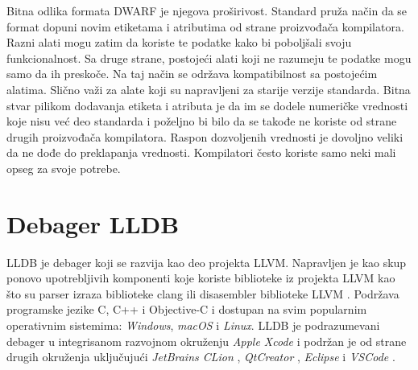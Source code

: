\documentclass[12pt,oneside]{memoir}
\begin{document}
Bitna odlika formata DWARF je njegova proširivost.
Standard pruža način da se format dopuni novim etiketama i atributima od strane proizvođača kompilatora.
Razni alati mogu zatim da koriste te podatke kako bi poboljšali svoju funkcionalnost.
Sa druge strane, postojeći alati koji ne razumeju te podatke mogu samo da ih preskoče.
Na taj način se održava kompatibilnost sa postojećim alatima.
Slično važi za alate koji su napravljeni za starije verzije standarda.
Bitna stvar pilikom dodavanja etiketa i atributa je da im se dodele numeričke vrednosti koje nisu već deo standarda i poželjno bi bilo da se takođe ne koriste od strane drugih proizvođača kompilatora.
Raspon dozvoljenih vrednosti je dovoljno veliki da ne dođe do preklapanja vrednosti.
Kompilatori često koriste samo neki mali opseg za svoje potrebe.

\section{Debager LLDB}
\label{sec:lldb}



LLDB je debager koji se razvija kao deo projekta LLVM.
Napravljen je kao skup ponovo upotrebljivih komponenti koje koriste biblioteke iz projekta LLVM kao što su parser izraza biblioteke clang ili disasembler biblioteke LLVM \cite{lldb}.
Podržava programske jezike C, C++ i Objective-C i dostupan na svim popularnim operativnim sistemima: \textit{Windows}, \textit{macOS} i \textit{Linux}.
LLDB je podrazumevani debager u integrisanom razvojnom okruženju \textit{Apple Xcode} \cite{lldb} i podržan je od strane drugih okruženja uključujući \textit{JetBrains CLion} \cite{clion}, \textit{QtCreator} \cite{qtcreator}, \textit{Eclipse} \cite{eclipse} i \textit{VSCode} \cite{vscode}.
\end{document}
